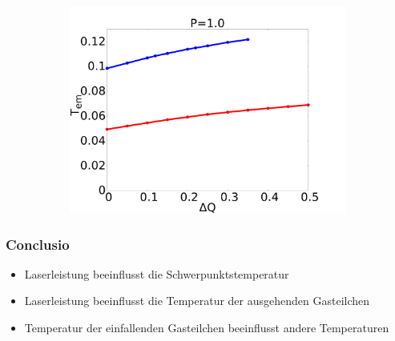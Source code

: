 \documentclass[handout]{beamer}
\begin{document}
\begin{frame}
\begin{figure}[h]
\begin{center}
\begin{subfigure}[t]{0.3\textwidth}
            \includegraphics[scale=0.09]{../images/p1_out.pdf}
        \end{subfigure} 
    \end{center}
\end{figure}
\end{frame}



\begin{frame}
\frametitle{Conclusio}
\begin{itemize}
\item Laserleistung beeinflusst die Schwerpunktstemperatur
\item Laserleistung beeinflusst die Temperatur der ausgehenden Gasteilchen 
\item Temperatur der einfallenden Gasteilchen beeinflusst andere Temperaturen 
\end{itemize}
\end{frame}



\end{document}
